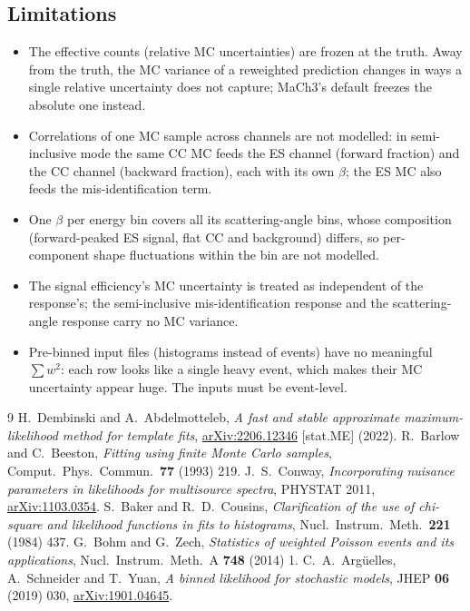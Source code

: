 \documentclass[11pt,a4paper]{article}
\begin{document}
\subsection{Limitations}

\begin{itemize}
  \item The effective counts (relative MC uncertainties) are frozen at the truth. Away from the
        truth, the MC variance of a reweighted prediction changes in ways a single relative
        uncertainty does not capture; MaCh3's default freezes the absolute one instead.
  \item Correlations of one MC sample across channels are not modelled: in semi-inclusive mode the
        same CC MC feeds the ES channel (forward fraction) and the CC channel (backward fraction),
        each with its own $\beta$; the ES MC also feeds the mis-identification term.
  \item One $\beta$ per energy bin covers all its scattering-angle bins, whose composition (forward-peaked
        ES signal, flat CC and background) differs, so per-component shape fluctuations
        within the bin are not modelled.
  \item The signal efficiency's MC uncertainty is treated as independent of the response's; the
        semi-inclusive mis-identification response and the scattering-angle response carry no MC
        variance.
  \item Pre-binned input files (histograms instead of events) have no meaningful
        $\sum w^2$: each row looks like a single heavy event, which makes their MC uncertainty
        appear huge. The inputs must be event-level.
\end{itemize}

\begin{thebibliography}{9}
 H.~Dembinski and A.~Abdelmotteleb, \emph{A fast and stable approximate
  maximum-likelihood method for template fits},
  \href{https://arxiv.org/abs/2206.12346}{arXiv:2206.12346} [stat.ME] (2022).
 R.~Barlow and C.~Beeston, \emph{Fitting using finite Monte Carlo samples},
  Comput.\ Phys.\ Commun.\ \textbf{77} (1993) 219.
 J.~S.~Conway, \emph{Incorporating nuisance parameters in likelihoods for
  multisource spectra}, PHYSTAT 2011, \href{https://arxiv.org/abs/1103.0354}{arXiv:1103.0354}.
 S.~Baker and R.~D.~Cousins, \emph{Clarification of the use of chi-square and
  likelihood functions in fits to histograms}, Nucl.\ Instrum.\ Meth.\ \textbf{221} (1984) 437.
 G.~Bohm and G.~Zech, \emph{Statistics of weighted Poisson events and its
  applications}, Nucl.\ Instrum.\ Meth.\ A \textbf{748} (2014) 1.
 C.~A.~Arg\"uelles, A.~Schneider and T.~Yuan, \emph{A binned likelihood for
  stochastic models}, JHEP \textbf{06} (2019) 030,
  \href{https://arxiv.org/abs/1901.04645}{arXiv:1901.04645}.
\end{thebibliography}
\end{document}
